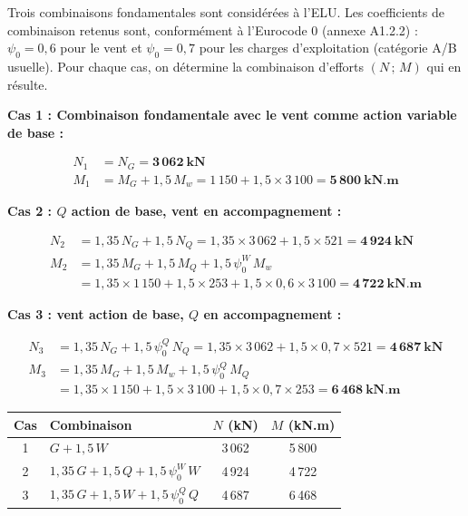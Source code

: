 Trois combinaisons fondamentales sont considérées à l'ELU. Les coefficients de combinaison retenus sont, conformément à l'Eurocode 0 (annexe A1.2.2) : $\psi_0 = 0{,}6$ pour le vent et $\psi_0 = 0{,}7$ pour les charges d'exploitation (catégorie A/B usuelle). Pour chaque cas, on détermine la combinaison d'efforts $(N \, ;\, M)$ qui en résulte.

\textbf{Cas 1 : Combinaison fondamentale avec le vent comme action variable de base :}

\[
\begin{aligned}
N_1 &= N_G = \mathbf{3\,062~\text{kN}}\\
M_1 &= M_G + 1{,}5 \, M_w = 1\,150 + 1{,}5 \times 3\,100 = \mathbf{5\,800~\text{kN.m}}
\end{aligned}
\]

\textbf{Cas 2 : $Q$ action de base, vent en accompagnement :}

\[
\begin{aligned}
N_2 &= 1{,}35 \, N_G + 1{,}5 \, N_Q = 1{,}35 \times 3\,062 + 1{,}5 \times 521 = \mathbf{4\,924~\text{kN}}\\
M_2 &= 1{,}35 \, M_G + 1{,}5 \, M_Q + 1{,}5 \, \psi_0^W \, M_w \\
    &= 1{,}35 \times 1\,150 + 1{,}5 \times 253 + 1{,}5 \times 0{,}6 \times 3\,100 = \mathbf{4\,722~\text{kN.m}}
\end{aligned}
\]

\textbf{Cas 3 : vent action de base, $Q$ en accompagnement :}

\[
\begin{aligned}
N_3 &= 1{,}35 \, N_G + 1{,}5 \, \psi_0^Q \, N_Q = 1{,}35 \times 3\,062 + 1{,}5 \times 0{,}7 \times 521 = \mathbf{4\,687~\text{kN}}\\
M_3 &= 1{,}35 \, M_G + 1{,}5 \, M_w + 1{,}5 \, \psi_0^Q \, M_Q \\
    &= 1{,}35 \times 1\,150 + 1{,}5 \times 3\,100 + 1{,}5 \times 0{,}7 \times 253 = \mathbf{6\,468~\text{kN.m}}
\end{aligned}
\]

\begin{center}
\begin{tabularx}{0.95\linewidth}{cXcc}
\toprule
\textbf{Cas} & \textbf{Combinaison} & \textbf{$N$ (kN)} & \textbf{$M$ (kN.m)} \\
\midrule
1 & $G + 1{,}5\,W$                                  & 3\,062 & 5\,800 \\
2 & $1{,}35\,G + 1{,}5\,Q + 1{,}5\,\psi_0^W \, W$   & 4\,924 & 4\,722 \\
3 & $1{,}35\,G + 1{,}5\,W + 1{,}5\,\psi_0^Q \, Q$   & 4\,687 & 6\,468 \\
\bottomrule
\end{tabularx}
\end{center}

